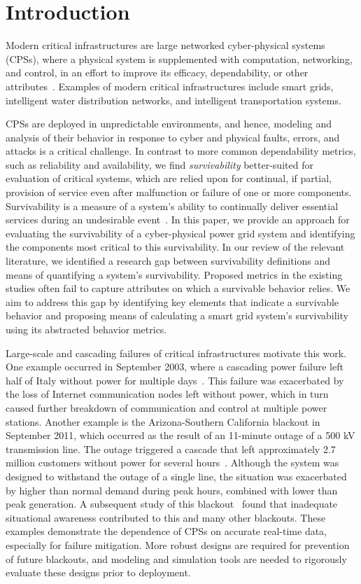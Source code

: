 \documentclass[review]{elsarticle}
\begin{document}

\section{Introduction}\label{sec:intro}
Modern critical infrastructures are large networked cyber-physical systems ({CPSs}), where a physical system is supplemented with computation, networking, and control, in an effort to improve its efficacy, dependability, or other attributes~\cite{RaI10,DeL12}. Examples of modern critical infrastructures include smart grids, intelligent water distribution networks, and intelligent transportation systems.

CPSs are deployed in unpredictable environments, and hence, modeling and analysis of their behavior in response to cyber and physical faults, errors, and attacks is a critical challenge. In contrast to more common dependability metrics, such as reliability and availability, we find \emph{survivability} better-suited for evaluation of critical systems, which are relied upon for continual, if partial, provision of service even after malfunction or failure of one or more components. Survivability is a measure of a system's ability to continually deliver essential services during an undesirable event~\cite{KnS03}. In this paper, we provide an approach for evaluating the survivability of a cyber-physical power grid system and identifying the components most critical to this survivability. In our review of the relevant literature, we identified a research gap between survivability definitions and means of quantifying a system's survivability. Proposed metrics in the existing studies often fail to capture attributes on which a survivable behavior relies. We aim to address this gap by identifying key elements that indicate a survivable behavior and proposing means of calculating a smart grid system's survivability using its abstracted behavior metrics.

Large-scale and cascading failures of critical infrastructures motivate this work. One example occurred in September 2003, where a cascading power failure left half of Italy without power for multiple days~\cite{BeA04}. This failure was exacerbated by the loss of Internet communication nodes left without power, which in turn caused further breakdown of communication and control at multiple power stations. Another example is the Arizona-Southern California blackout in September 2011, which occurred as the result of an 11-minute outage of a 500 kV transmission line. The outage triggered a cascade that left approximately 2.7 million customers without power for several hours~\cite{FERC12}. Although the system was designed to withstand the outage of a single line, the situation was exacerbated by higher than normal demand during peak hours, combined with lower than peak generation. A subsequent study of this blackout~\cite{FERC12} found that inadequate situational awareness contributed to this and many other blackouts. These examples demonstrate the dependence of CPSs on accurate real-time data, especially for failure mitigation. More robust designs are required for prevention of future blackouts, and modeling and simulation tools are needed to rigorously evaluate these designs prior to deployment.
\end{document}
